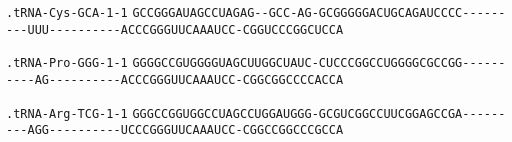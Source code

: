 \documentclass{article}
\newcommand{\rnabox}[1]{\colorbox{#1}{\texttt{#1}}}
\begin{document}
\texttt{.tRNA-Cys-GCA-1-1}
\rnabox{G}\rnabox{C}\rnabox{C}\rnabox{G}\rnabox{G}\rnabox{G}\rnabox{A}\rnabox{U}\rnabox{A}\rnabox{G}\rnabox{C}\rnabox{C}\rnabox{U}\rnabox{A}\rnabox{G}\rnabox{A}\rnabox{G}\rnabox{-}\rnabox{-}\rnabox{G}\rnabox{C}\rnabox{C}\rnabox{-}\rnabox{A}\rnabox{G}\rnabox{-}\rnabox{G}\rnabox{C}\rnabox{G}\rnabox{G}\rnabox{G}\rnabox{G}\rnabox{G}\rnabox{A}\rnabox{C}\rnabox{U}\rnabox{G}\rnabox{C}\rnabox{A}\rnabox{G}\rnabox{A}\rnabox{U}\rnabox{C}\rnabox{C}\rnabox{C}\rnabox{C}\rnabox{-}\rnabox{-}\rnabox{-}\rnabox{-}\rnabox{-}\rnabox{-}\rnabox{-}\rnabox{-}\rnabox{-}\rnabox{U}\rnabox{U}\rnabox{U}\rnabox{-}\rnabox{-}\rnabox{-}\rnabox{-}\rnabox{-}\rnabox{-}\rnabox{-}\rnabox{-}\rnabox{-}\rnabox{-}\rnabox{A}\rnabox{C}\rnabox{C}\rnabox{C}\rnabox{G}\rnabox{G}\rnabox{G}\rnabox{U}\rnabox{U}\rnabox{C}\rnabox{A}\rnabox{A}\rnabox{A}\rnabox{U}\rnabox{C}\rnabox{C}\rnabox{-}\rnabox{C}\rnabox{G}\rnabox{G}\rnabox{U}\rnabox{C}\rnabox{C}\rnabox{C}\rnabox{G}\rnabox{G}\rnabox{C}\rnabox{U}\rnabox{C}\rnabox{C}\rnabox{A}

\vspace{-0.5mm}

\texttt{.tRNA-Pro-GGG-1-1}
\rnabox{G}\rnabox{G}\rnabox{G}\rnabox{G}\rnabox{C}\rnabox{C}\rnabox{G}\rnabox{U}\rnabox{G}\rnabox{G}\rnabox{G}\rnabox{G}\rnabox{U}\rnabox{A}\rnabox{G}\rnabox{C}\rnabox{U}\rnabox{U}\rnabox{G}\rnabox{G}\rnabox{C}\rnabox{U}\rnabox{A}\rnabox{U}\rnabox{C}\rnabox{-}\rnabox{C}\rnabox{U}\rnabox{C}\rnabox{C}\rnabox{C}\rnabox{G}\rnabox{G}\rnabox{C}\rnabox{C}\rnabox{U}\rnabox{G}\rnabox{G}\rnabox{G}\rnabox{G}\rnabox{C}\rnabox{G}\rnabox{C}\rnabox{C}\rnabox{G}\rnabox{G}\rnabox{-}\rnabox{-}\rnabox{-}\rnabox{-}\rnabox{-}\rnabox{-}\rnabox{-}\rnabox{-}\rnabox{-}\rnabox{-}\rnabox{A}\rnabox{G}\rnabox{-}\rnabox{-}\rnabox{-}\rnabox{-}\rnabox{-}\rnabox{-}\rnabox{-}\rnabox{-}\rnabox{-}\rnabox{-}\rnabox{A}\rnabox{C}\rnabox{C}\rnabox{C}\rnabox{G}\rnabox{G}\rnabox{G}\rnabox{U}\rnabox{U}\rnabox{C}\rnabox{A}\rnabox{A}\rnabox{A}\rnabox{U}\rnabox{C}\rnabox{C}\rnabox{-}\rnabox{C}\rnabox{G}\rnabox{G}\rnabox{C}\rnabox{G}\rnabox{G}\rnabox{C}\rnabox{C}\rnabox{C}\rnabox{C}\rnabox{A}\rnabox{C}\rnabox{C}\rnabox{A}

\vspace{-0.5mm}

\texttt{.tRNA-Arg-TCG-1-1}
\rnabox{G}\rnabox{G}\rnabox{G}\rnabox{C}\rnabox{C}\rnabox{G}\rnabox{G}\rnabox{U}\rnabox{G}\rnabox{G}\rnabox{C}\rnabox{C}\rnabox{U}\rnabox{A}\rnabox{G}\rnabox{C}\rnabox{C}\rnabox{U}\rnabox{G}\rnabox{G}\rnabox{A}\rnabox{U}\rnabox{G}\rnabox{G}\rnabox{G}\rnabox{-}\rnabox{G}\rnabox{C}\rnabox{G}\rnabox{U}\rnabox{C}\rnabox{G}\rnabox{G}\rnabox{C}\rnabox{C}\rnabox{U}\rnabox{U}\rnabox{C}\rnabox{G}\rnabox{G}\rnabox{A}\rnabox{G}\rnabox{C}\rnabox{C}\rnabox{G}\rnabox{A}\rnabox{-}\rnabox{-}\rnabox{-}\rnabox{-}\rnabox{-}\rnabox{-}\rnabox{-}\rnabox{-}\rnabox{-}\rnabox{A}\rnabox{G}\rnabox{G}\rnabox{-}\rnabox{-}\rnabox{-}\rnabox{-}\rnabox{-}\rnabox{-}\rnabox{-}\rnabox{-}\rnabox{-}\rnabox{-}\rnabox{U}\rnabox{C}\rnabox{C}\rnabox{C}\rnabox{G}\rnabox{G}\rnabox{G}\rnabox{U}\rnabox{U}\rnabox{C}\rnabox{A}\rnabox{A}\rnabox{A}\rnabox{U}\rnabox{C}\rnabox{C}\rnabox{-}\rnabox{C}\rnabox{G}\rnabox{G}\rnabox{C}\rnabox{C}\rnabox{G}\rnabox{G}\rnabox{C}\rnabox{C}\rnabox{C}\rnabox{G}\rnabox{C}\rnabox{C}\rnabox{A}
\end{document}
